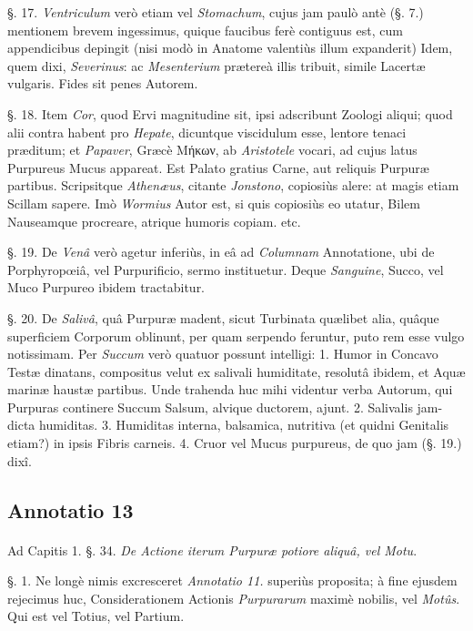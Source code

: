 \documentclass[a4paper, 11pt, oneside, polutonikogreek, german]{article}
\begin{document}
§. 17. \emph{Ventriculum} verò etiam vel \emph{Stomachum}, cujus jam paulò antè (§. 7.) mentionem brevem ingessimus, quique faucibus ferè contiguus est, cum appendicibus depingit (nisi modò in Anatome valentiùs illum expanderit) Idem, quem dixi, \emph{Severinus}: ac \emph{Mesenterium} prætereà illis tribuit, simile Lacertæ vulgaris. Fides sit penes Autorem.

§. 18. Item \emph{Cor}, quod Ervi magnitudine sit, ipsi adscribunt Zoologi aliqui; quod alii contra habent pro \emph{Hepate}, dicuntque viscidulum esse, lentore tenaci præditum; et \emph{Papaver}, Græcè Μήκων, ab \emph{Aristotele} vocari, ad cujus latus Purpureus Mucus appareat. Est Palato gratius Carne, aut reliquis Purpuræ partibus. Scripsitque \emph{Athenæus}, citante \emph{Jonstono}, copiosiùs alere: at magis etiam Scillam sapere. Imò \emph{Wormius} Autor est, si quis copiosiùs eo utatur, Bilem Nauseamque procreare, atrique humoris copiam. etc.

§. 19. De \emph{Venâ} verò agetur inferiùs, in eâ ad \emph{Columnam} Annotatione, ubi de Porphyropœiâ, vel Purpurificio, sermo instituetur. Deque \emph{Sanguine}, Succo, vel Muco Purpureo ibidem tractabitur.

§. 20. De \emph{Salivâ}, quâ Purpuræ madent, sicut Turbinata quælibet alia, quâque superficiem Corporum oblinunt, per quam serpendo feruntur, puto rem esse vulgo notissimam. Per \emph{Succum} verò quatuor possunt intelligi: 1. Humor in Concavo Testæ dinatans, compositus velut ex salivali humiditate, resolutâ ibidem, et Aquæ marinæ haustæ partibus. Unde trahenda huc mihi videntur verba Autorum, qui Purpuras continere Succum Salsum, alvique ductorem, ajunt. 2. Salivalis jam-dicta humiditas. 3. Humiditas interna, balsamica, nutritiva (et quidni Genitalis etiam?) in ipsis Fibris carneis. 4. Cruor vel Mucus purpureus, de quo jam (§. 19.) dixî.

\subsection{Annotatio 13}
\paragraph{}
Ad Capitis 1. §. 34. \emph{De Actione iterum Purpuræ potiore aliquâ, vel Motu}.

§. 1. Ne longè nimis excresceret \emph{Annotatio 11.} superiùs proposita; à fine ejusdem rejecimus huc, Considerationem Actionis \emph{Purpurarum} maximè nobilis, vel \emph{Motûs}. Qui est vel Totius, vel Partium.
\end{document}
